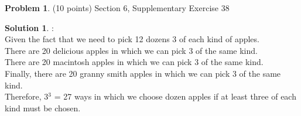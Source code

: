 \documentclass{article}
\theoremstyle{definition}
\newtheorem{problem}{Problem}
\newtheorem*{solution}{Solution}
\begin{document}
\newpage

\begin{problem} (10 points) Section 6, Supplementary Exercise 38
\end{problem}
\begin{solution}:
\\
Given the fact that we need to pick 12 dozens 3 of each kind of apples.
\\
There are 20 delicious apples in which we can pick 3 of the same kind.
\\
There are 20 macintosh apples in which we can pick 3 of the same kind.
\\ 
Finally, there are 20 granny smith apples in which we can pick 3 of the same kind.
\\
Therefore, 3$^3$ = 27 ways in which we choose dozen apples if at least three of each kind must be chosen.
\end{solution}

\newpage
\end{document}
